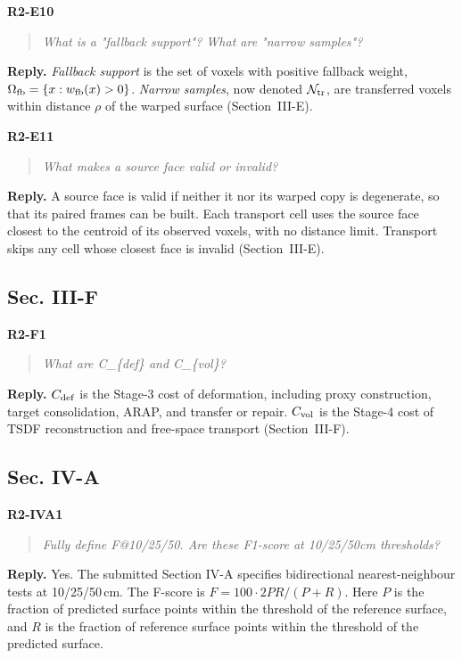 \documentclass[11pt,a4paper]{article}
\newcommand{\point}[2]{\par\medskip\textbf{#1}\par\begin{quote}\itshape #2\end{quote}}
\newenvironment{reply}{\begingroup\color{replyblue}\textbf{Reply.} }{\par\endgroup}
\begin{document}
\point{R2-E10}{What is a "fallback support"? What are "narrow samples"?}
\begin{reply}
\emph{Fallback support} is the set of voxels with positive fallback weight, $\Omega_{\rm fb}=\{x:w_{\rm fb}(x)>0\}$. \emph{Narrow samples}, now denoted $\mathcal N_{\rm tr}$, are transferred voxels within distance $\rho$ of the warped surface (Section~III-E).
\end{reply}

\point{R2-E11}{What makes a source face valid or invalid?}
\begin{reply}
A source face is valid if neither it nor its warped copy is degenerate, so that its paired frames can be built. Each transport cell uses the source face closest to the centroid of its observed voxels, with no distance limit. Transport skips any cell whose closest face is invalid (Section~III-E).
\end{reply}

\subsection*{Sec. III-F}

\point{R2-F1}{What are C\_\{def\} and C\_\{vol\}?}
\begin{reply}
$C_{\rm def}$ is the Stage-3 cost of deformation, including proxy construction, target consolidation, ARAP, and transfer or repair. $C_{\rm vol}$ is the Stage-4 cost of TSDF reconstruction and free-space transport (Section~III-F).
\end{reply}

\subsection*{Sec. IV-A}

\point{R2-IVA1}{Fully define F@10/25/50. Are these F1-score at 10/25/50cm thresholds?}
\begin{reply}
Yes. The submitted Section IV-A specifies bidirectional nearest-neighbour tests at 10/25/50\,cm. The F-score is $F=100\cdot2PR/(P+R)$. Here $P$ is the fraction of predicted surface points within the threshold of the reference surface, and $R$ is the fraction of reference surface points within the threshold of the predicted surface.
\end{reply}
\end{document}

